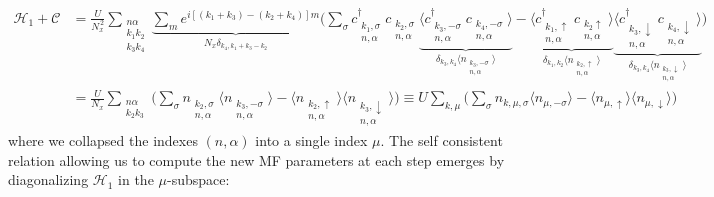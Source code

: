 \begin{equation}
\begin{split}
\mathcal{H}_1 + \mathcal{C} &= \frac{U}{N_x^{\,2}} \sum_{\substack{n \alpha \\ k_1 k_2 \\ k_3 k_4}} \underbrace{\sum_m e^{i [ (k_1 + k_3) - (k_2 + k_4) ] m}}_{N_x \delta_{k_4, k_1 + k_3 - k_2}} \bigg( \sum_\sigma c_{\substack{k_1, \sigma \\ n, \alpha}}^\dagger c_{\substack{k_2, \sigma \\ n, \alpha}} \underbrace{\big\langle c_{\substack{k_3, -\sigma\\ n, \alpha}}^\dagger c_{\substack{k_4, -\sigma \\ n, \alpha}} \big\rangle}_{\delta_{k_3, k_4} \big\langle n_{\substack{k_3,-\sigma \\ n, \alpha}} \big\rangle} - \underbrace{\big\langle c_{\substack{k_1, \uparrow \\ n, \alpha}}^\dagger c_{\substack{k_2  \uparrow \\n, \alpha}} \big\rangle}_{\delta_{k_1, k_2} \big\langle n_{\substack{k_2,\uparrow \\ n, \alpha}} \big\rangle} \underbrace{\big\langle c_{\substack{k_3, \downarrow \\ n, \alpha}}^\dagger c_{\substack{k_4, \downarrow \\ n, \alpha}} \big\rangle}_{\delta_{k_3, k_4} \big\langle n_{\substack{k_3,\downarrow \\ n, \alpha}} \big\rangle}  \bigg) \\
&= \frac{U}{N_x} \sum_{\substack{n \alpha \\ k_2 k_3}} \bigg( \sum_\sigma n_{\substack{k_2, \sigma \\ n, \alpha}} \big\langle n_{\substack{k_3, -\sigma \\ n, \alpha}} \big\rangle - \big\langle n_{\substack{k_2, \uparrow \\ n, \alpha}} \big\rangle \big\langle n_{\substack{k_3, \downarrow \\ n, \alpha}} \big\rangle \bigg) \equiv
U \sum_{k, \mu} \bigg( \sum_\sigma n_{k,\mu, \sigma} \big\langle n_{\mu, -\sigma} \big\rangle - \big\langle n_{\mu, \uparrow} \big\rangle \big\langle n_{\mu, \downarrow} \big\rangle \bigg)
\end{split}
\end{equation}
where we collapsed the indexes $(n, \alpha)$ into a single index $\mu$.
The self consistent relation allowing us to compute the new MF parameters at each step emerges by diagonalizing $\mathcal{H}_1$ in the $\mu$-subspace:
